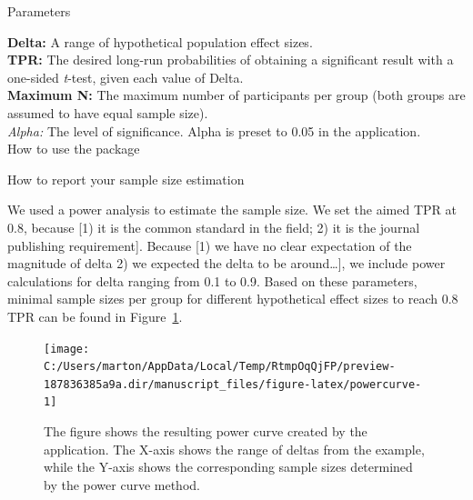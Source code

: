 \documentclass[
  english,
  man,floatsintext]{apa6}
\newenvironment{Shaded}{\begin{snugshade}}{\end{snugshade}}
\newcommand{\AttributeTok}[1]{\textcolor[rgb]{0.77,0.63,0.00}{#1}}
\newcommand{\CommentTok}[1]{\textcolor[rgb]{0.56,0.35,0.01}{\textit{#1}}}
\newcommand{\ConstantTok}[1]{\textcolor[rgb]{0.00,0.00,0.00}{#1}}
\newcommand{\DecValTok}[1]{\textcolor[rgb]{0.00,0.00,0.81}{#1}}
\newcommand{\FloatTok}[1]{\textcolor[rgb]{0.00,0.00,0.81}{#1}}
\newcommand{\FunctionTok}[1]{\textcolor[rgb]{0.00,0.00,0.00}{#1}}
\newcommand{\NormalTok}[1]{#1}
\newcommand{\OtherTok}[1]{\textcolor[rgb]{0.56,0.35,0.01}{#1}}
\newcommand{\SpecialCharTok}[1]{\textcolor[rgb]{0.00,0.00,0.00}{#1}}
\begin{document}
Parameters

\textbf{Delta:} A range of hypothetical population effect sizes.\\
\textbf{TPR:} The desired long-run probabilities of obtaining a significant result with a one-sided \emph{t}-test, given each value of Delta.\\
\textbf{Maximum N:} The maximum number of participants per group (both groups are assumed to have equal sample size).\\
\emph{Alpha:} The level of significance. Alpha is preset to 0.05 in the application.\\

How to use the package

\begin{Shaded}
\end{Shaded}

How to report your sample size estimation

We used a power analysis to estimate the sample size. We set the aimed TPR at 0.8, because {[}1) it is the common standard in the field; 2) it is the journal publishing requirement{]}. Because {[}1) we have no clear expectation of the magnitude of delta 2) we expected the delta to be around\ldots{]}, we include power calculations for delta ranging from 0.1 to 0.9. Based on these parameters, minimal sample sizes per group for different hypothetical effect sizes to reach 0.8 TPR can be found in Figure~\ref{fig:powercurve}.

\begin{figure}

{\centering \texttt{[image: C:/Users/marton/AppData/Local/Temp/RtmpOqQjFP/preview-187836385a9a.dir/manuscript\_files/figure-latex/powercurve-1]} 

}

\caption{The figure shows the resulting power curve created by the application. The X-axis shows the range of deltas from the example, while the Y-axis shows the corresponding sample sizes determined by the power curve method.}\label{fig:powercurve}
\end{figure}
\end{document}
